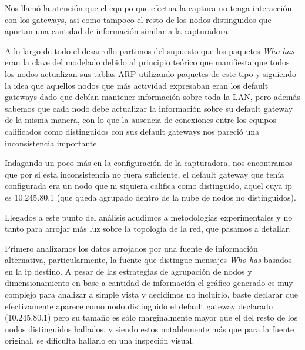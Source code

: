 Nos llamó la atención que el equipo que efectua la captura no tenga interacción con los gateways, asi como tampoco el resto de los nodos distinguidos que aportan una cantidad de información similar a la capturadora. 

A lo largo de todo el desarrollo partimos del supuesto que los paquetes \textit{Who-has} eran la clave del modelado debido al principio teórico que manifiesta que todos los nodos actualizan sus tablas ARP utilizando paquetes de este tipo y siguiendo la idea que aquellos nodos que más actividad expresaban eran los default gateways dado que debían mantener información sobre toda la LAN, pero además sabemos que cada nodo debe actualizar la información sobre su default gateway de la misma manera, con lo que la ausencia de conexiones entre los equipos calificados como distinguidos con sus default gateways nos pareció una inconsistencia importante.

Indagando un poco más en la configuración de la capturadora, nos encontramos que por si esta inconsistencia no fuera suficiente, el default gateway que tenía configurada era un nodo que ni siquiera califica como distinguido, aquel cuya ip es 10.245.80.1 (que queda agrupado dentro de la nube de nodos no distinguidos). 

Llegados a este punto del análisis acudimos a metodologías experimentales y no tanto para arrojar más luz sobre la topología de la red, que pasamos a detallar.

Primero analizamos los datos arrojados por una fuente de información alternativa, particularmente, la fuente que distingue mensajes \textit{Who-has} basados en la ip destino. A pesar de las estrategias de agrupación de nodos y dimensionamiento en base a cantidad de información el gráfico generado es muy complejo para analizar a simple vista y decidimos no incluirlo, baste declarar que efectivamente aparece como nodo distinguido el default gateway declarado (10.245.80.1) pero su tamaño es sólo marginalmente mayor que el del resto de los nodos distinguidos hallados, y siendo estos notablemente más que para la fuente original, se dificulta hallarlo en una inspeción visual.

